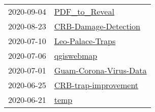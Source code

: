 \begin{longtable}{ll}
2020-09-04 &                                               \href{https://github.com/aubreymoore/PDF\_to\_Reveal}{PDF\_to\_Reveal} \\
2020-08-23 &                                 \href{https://github.com/aubreymoore/CRB-Damage-Detection}{CRB-Damage-Detection} \\
2020-07-10 &                                         \href{https://github.com/aubreymoore/Leo-Palace-Traps}{Leo-Palace-Traps} \\
2020-07-06 &                                                     \href{https://github.com/aubreymoore/qgiswebmap}{qgiswebmap} \\
2020-07-01 &                             \href{https://github.com/aubreymoore/Guam-Corona-Virus-Data}{Guam-Corona-Virus-Data} \\
2020-06-25 &                                 \href{https://github.com/aubreymoore/CRB-trap-improvement}{CRB-trap-improvement} \\
2020-06-21 &                                                                 \href{https://github.com/aubreymoore/temp}{temp} \\
\end{longtable}
